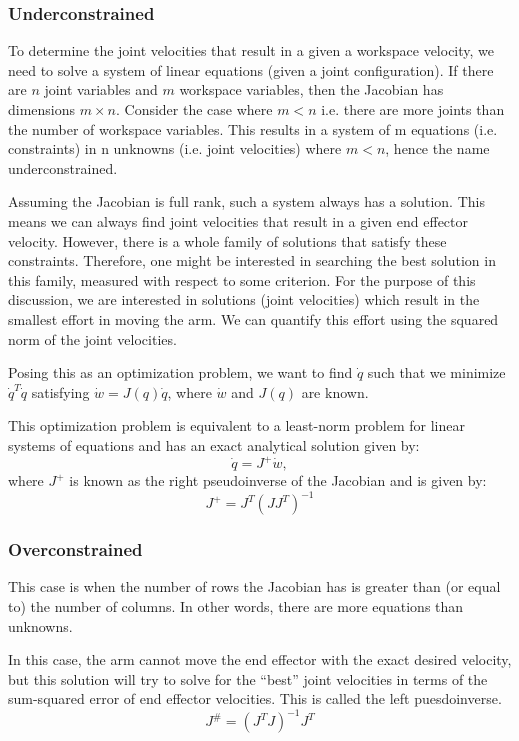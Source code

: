 \documentclass{16384_doc} %
\begin{document}
\subsubsection{Underconstrained}
To determine the joint velocities that result in a given a workspace velocity, we need to solve a system of linear equations (given a joint configuration).   If there are $n$ joint variables and $m$ workspace variables, then the Jacobian has dimensions $m \times n$.  Consider the case where $m < n$ i.e. there are more joints than the number of workspace variables. This results in a system of m equations (i.e. constraints) in n unknowns (i.e. joint velocities) where $m < n$, hence the name underconstrained.

Assuming the Jacobian is full rank, such a system always has a solution. This means we can always find joint velocities that result in a given end effector velocity. However, there is a whole family of solutions that satisfy these constraints. Therefore, one might be interested in searching the best solution in this family, measured with respect to some criterion. For the purpose of this discussion, we are interested in solutions (joint velocities) which result in the smallest effort in moving the arm. We can quantify this effort using the squared norm of the joint velocities.

Posing this as an optimization problem, we want to find $\dot q$ such that we minimize $\dot q^T \dot q$ satisfying $\dot w = J(q) \dot q$, where $\dot w$ and $J(q)$ are known.

This optimization problem is equivalent to a least-norm problem for linear systems of equations and has an exact analytical solution given by:
\[
\dot q = J^+ \dot w,
\]
where $J^+$ is known as the right pseudoinverse of the Jacobian and is given by:
\[
J^+ = J^T(JJ^T)^{-1}
\]


\subsubsection{Overconstrained}
This case is when the number of rows the Jacobian has is greater than (or equal
to) the number of columns. In other words, there are more equations than unknowns.

In this case, the arm cannot move the end effector with the exact desired
velocity, but this solution will try to solve for the ``best'' joint velocities in
terms of the sum-squared error of end effector velocities. This is called the left puesdoinverse.
\[
J^\# = (J^TJ)^{-1}J^T
\]
\end{document}
